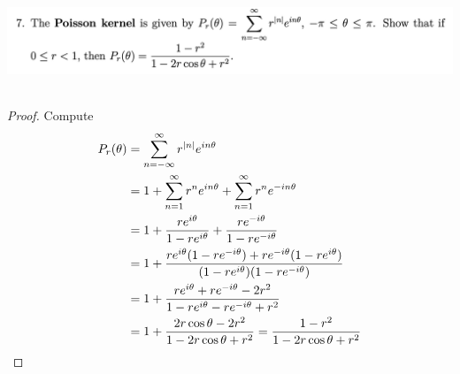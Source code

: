 \documentclass{report}
\begin{document}
\begin{question}{}{}
\includegraphics[height=3cm,width=18cm]{hw3q7}
\end{question}
\begin{proof}
Compute 
\begin{align*}
P_r(\theta)&=\sum_{n=-\infty}^{\infty}r^{\left|n\right|}e^{i n\theta}\\
&=1+\sum_{n=1}^{\infty}r^n e^{i n\theta} + \sum_{n=1}^{\infty}r^n e^{-i n \theta}\\
&=1+\frac{re^{i\theta}}{1-re^{i\theta}}+\frac{re^{-i\theta}}{1-re^{-i \theta}}\\
&=1+ \frac{re^{i\theta}(1-re^{-i\theta})+re^{-i\theta}(1-re^{i\theta})}{(1-re^{i\theta})(1-re^{-i \theta})}\\
&=1+ \frac{re^{i\theta}+re^{-i\theta}-2r^2}{1-re^{i\theta}-re^{-i\theta}+r^2}\\
&=1+\frac{2r\cos \theta-2r^2}{1-2r\cos \theta+r^2}=\frac{1-r^2}{1-2r\cos \theta +r^2}
\end{align*}
\end{proof}
\end{document}
